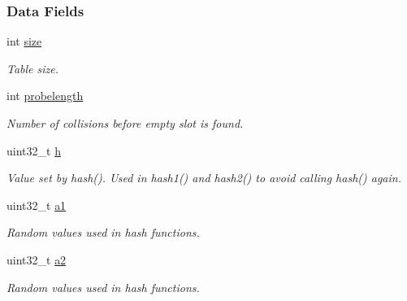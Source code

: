 \subsubsection*{Data Fields}
\begin{DoxyCompactItemize}
\item 
\mbox{\label{structhashtable__struct_a0fb42778e1d783631e499751ba367b06}} 
int \hyperlink{structhashtable__struct_a0fb42778e1d783631e499751ba367b06}{size}
\begin{DoxyCompactList}\small\item\em Table size. \end{DoxyCompactList}\item 
\mbox{\label{structhashtable__struct_a861882ffbcb186d96f90b82d1dc39f40}} 
int \hyperlink{structhashtable__struct_a861882ffbcb186d96f90b82d1dc39f40}{probelength}
\begin{DoxyCompactList}\small\item\em Number of collisions before empty slot is found. \end{DoxyCompactList}\item 
\mbox{\label{structhashtable__struct_ae77d63df7a927e68de61d431d5bc0ddc}} 
uint32\+\_\+t \hyperlink{structhashtable__struct_ae77d63df7a927e68de61d431d5bc0ddc}{h}
\begin{DoxyCompactList}\small\item\em Value set by hash(). Used in hash1() and hash2() to avoid calling hash() again. \end{DoxyCompactList}\item 
\mbox{\label{structhashtable__struct_a563092db06242cc9e284954b01c3b133}} 
uint32\+\_\+t \hyperlink{structhashtable__struct_a563092db06242cc9e284954b01c3b133}{a1}
\begin{DoxyCompactList}\small\item\em Random values used in hash functions. \end{DoxyCompactList}\item 
\mbox{\label{structhashtable__struct_af183bbfbf1e17f0f82ac0ea623f383e3}} 
uint32\+\_\+t \hyperlink{structhashtable__struct_af183bbfbf1e17f0f82ac0ea623f383e3}{a2}
\begin{DoxyCompactList}\small\item\em Random values used in hash functions. \end{DoxyCompactList}\item 

\end{DoxyCompactItemize}
